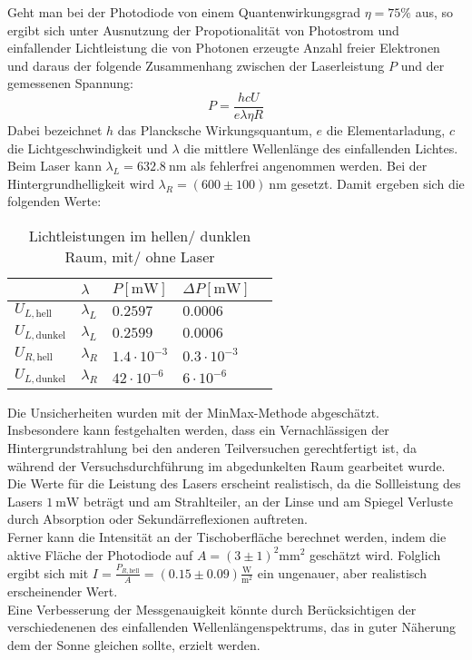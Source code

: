 \documentclass[11pt,a4paper,oneside]{scrartcl}
\begin{document}
Geht man bei der Photodiode von einem Quantenwirkungsgrad $\eta=75\%$ aus, so ergibt sich unter Ausnutzung der Propotionalität von Photostrom und einfallender Lichtleistung die von Photonen erzeugte Anzahl freier Elektronen und daraus der folgende Zusammenhang zwischen der Laserleistung $P$ und der gemessenen Spannung:
\begin{equation}\label{P_diode}
P=\frac{hcU}{e\lambda\eta R}
\end{equation}
Dabei bezeichnet $h$ das Plancksche Wirkungsquantum, $e$ die Elementarladung, $c$ die Lichtgeschwindigkeit und $\lambda$ die mittlere Wellenlänge des einfallenden Lichtes. Beim Laser kann $\lambda_L=632.8\ \mathrm{nm}$ als fehlerfrei angenommen werden. Bei der Hintergrundhelligkeit wird $\lambda_R=(600\pm 100)\ \mathrm{nm}$ gesetzt.
Damit ergeben sich die folgenden Werte:\\
\begin{table}[H]
\centering
\begin{tabular}{@{}lllll@{}}
\toprule
                        & $\lambda$   & $P [\mathrm{mW}]$  & $\Delta P[\mathrm{mW}]$ &  \\ \midrule
$U_{L,\mathrm{hell}}$   & $\lambda_L$ & $0.2597$           & $0.0006$                &  \\
$U_{L,\mathrm{dunkel}}$ & $\lambda_L$ & $0.2599$           & $0.0006$                &  \\
$U_{R,\mathrm{hell}}$   & $\lambda_R$ & $1.4\cdot 10^{-3}$ & $0.3\cdot 10^{-3}$      &  \\
$U_{L,\mathrm{dunkel}}$ & $\lambda_R$ & $42\cdot 10^{-6}$  & $6\cdot10^{-6}$         &  \\ \bottomrule
\end{tabular}
\caption{Lichtleistungen im hellen/ dunklen Raum, mit/ ohne Laser}
\end{table}
Die Unsicherheiten wurden mit der MinMax-Methode abgeschätzt.\\
Insbesondere kann festgehalten werden, dass ein Vernachlässigen der Hintergrundstrahlung bei den anderen Teilversuchen gerechtfertigt ist, da während der Versuchsdurchführung im abgedunkelten Raum gearbeitet wurde. Die Werte für die Leistung des Lasers erscheint realistisch, da die Sollleistung des Lasers $1\ \mathrm{mW}$ beträgt und am Strahlteiler, an der Linse und am Spiegel Verluste durch Absorption oder Sekundärreflexionen auftreten.\\
Ferner kann die Intensität an der Tischoberfläche berechnet werden, indem die aktive Fläche der Photodiode auf $A=(3\pm1)^2\mathrm{mm}^2$ geschätzt wird. Folglich ergibt sich mit $I=\frac{P_{R,\mathrm{hell}}}{A}=(0.15\pm0.09)\frac{\mathrm{W}}{\mathrm m^2}$ ein ungenauer, aber realistisch erscheinender Wert. \\
Eine Verbesserung der Messgenauigkeit könnte durch Berücksichtigen der verschiedenenen des einfallenden Wellenlängenspektrums, das in guter Näherung dem der Sonne gleichen sollte, erzielt werden. 
\end{document}
